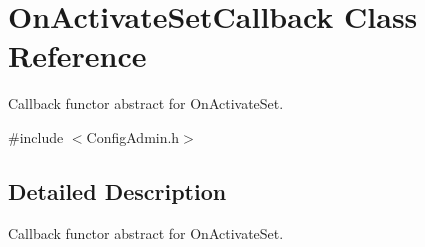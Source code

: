 \section{OnActivateSetCallback Class Reference}
\label{classOnActivateSetCallback}


Callback functor abstract for OnActivateSet.  




{\ttfamily \#include $<$ConfigAdmin.h$>$}



\subsection{Detailed Description}
Callback functor abstract for OnActivateSet. 
